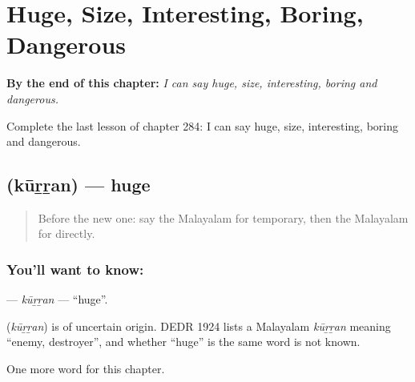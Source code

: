 
\chapter{Huge, Size, Interesting, Boring, Dangerous}
\label{ch:ml-huge-size-interesting-boring-dangerous}

\begin{chapteropening}
\textbf{By the end of this chapter:} \emph{I can say huge, size, interesting, boring and dangerous.}

Complete the last lesson of chapter 284: I can say huge, size, interesting, boring and dangerous.
\end{chapteropening}

\section[\texorpdfstring{\ml{കൂറ്റൻ} (kūṟṟan)}{കൂറ്റൻ (kūṟṟan)}]{ (kūṟṟan) — huge}

\label{lesson:ML-C284-kurran}



\begin{quote}
Before the new one: say the Malayalam for temporary, then the Malayalam for directly.
\end{quote}

\subsection*{You'll want to know: }
\textbf{} — \emph{kūṟṟan} — \textquotedblleft{}huge\textquotedblright{}.

\begin{cousinweb}
\textbf{} (\emph{kūṟṟan}) is of uncertain origin. DEDR 1924 lists a Malayalam \emph{kūṟṟan} meaning \textquotedblleft{}enemy, destroyer\textquotedblright{}, and whether \textquotedblleft{}huge\textquotedblright{} is the same word is not known.
\end{cousinweb}

\begin{grammarlens}[title={What you've built}]
One more word for this chapter.
\end{grammarlens}

